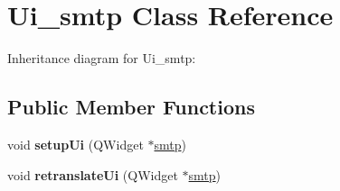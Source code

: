 \hypertarget{class_ui__smtp}{\section{Ui\+\_\+smtp Class Reference}
\label{class_ui__smtp}
}


Inheritance diagram for Ui\+\_\+smtp\+:
\subsection*{Public Member Functions}
\begin{DoxyCompactItemize}
\item 
\hypertarget{class_ui__smtp_aa4db48cdb3f1951759e6556713f67a56}{void {\bfseries setup\+Ui} (Q\+Widget $\ast$\hyperlink{classsmtp}{smtp})}\label{class_ui__smtp_aa4db48cdb3f1951759e6556713f67a56}

\item 
\hypertarget{class_ui__smtp_a7d2ba486777c468036f9d5597250de83}{void {\bfseries retranslate\+Ui} (Q\+Widget $\ast$\hyperlink{classsmtp}{smtp})}\label{class_ui__smtp_a7d2ba486777c468036f9d5597250de83}

\end{DoxyCompactItemize}
